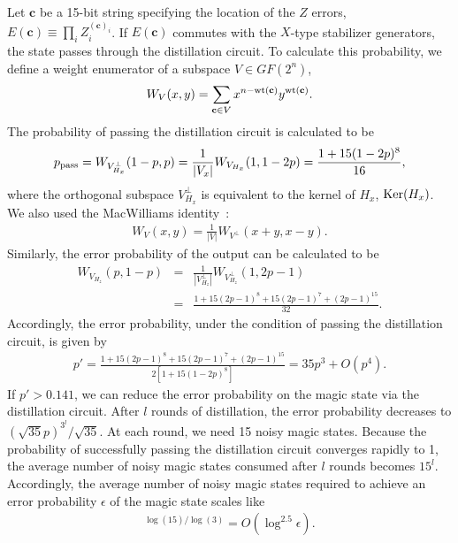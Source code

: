 Let $\mathbf{c}$ be a 15-bit string specifying the location of the $Z$ errors, $ E(\mathbf{c})\equiv \prod_i Z_i^{(\mathbf{c})_i}$.
If $E(\mathbf{c})$ commutes with the $X$-type stabilizer generators, the state passes through the distillation circuit.
To calculate this probability, we define a weight enumerator of a subspace $V \in GF(2^n)$,
\begin{eqnarray}
W_V(x,y)= \sum _{\mathbf{c} \in V} x^{n-{\rm wt}(\mathbf{c})} y^{{\rm wt}(\mathbf{c})}.
\end{eqnarray}
The probability of passing the distillation circuit is calculated to be
\begin{eqnarray}
p_{\rm pass}=W_{V_{H_x}^{\perp}}(1-p,p) = \frac{1}{|V_{x}|} W_{V_{H_x}}(1,1-2p) = \frac{1+15(1-2p)^8}{16} ,
\end{eqnarray}
where the orthogonal subspace $V_{H_x}^{\perp}$ is equivalent to the kernel of $H_x$, ${\rm Ker}(H_x)$. 
We also used the MacWilliams identity~\cite{macwilliams}:
\begin{eqnarray}
W_{V}(x,y)= \frac{1}{|V|} W_{V^{\perp}}(x+y,x-y).
\end{eqnarray}
Similarly, the error probability of the output can be calculated to be 
\begin{eqnarray}
W_{V_{H_z}}(p,1-p)&=&\frac{1}{|V_{H_z}^{\perp}|}W_{V_{H_z}^{\perp}}(1,2p-1) 
\\
&=& \frac{1+15(2p-1)^8+15(2p-1)^{7}+(2p-1)^{15}}{32}.
\end{eqnarray}
Accordingly, the error probability, under the condition of passing the distillation circuit, is given by
\begin{eqnarray}
p' = \frac{1+15(2p-1)^8+15(2p-1)^{7}+(2p-1)^{15}}{2[1+15(1-2p)^8]} = 35p^3+O(p^4).
\end{eqnarray}
If $p'>0.141$, we can reduce the error probability on the magic state via the distillation circuit.
After $l$ rounds of distillation, the error probability decreases to $(\sqrt{35} p)^{3^l}/\sqrt{35}$.
At each round, we need 15 noisy magic states. 
Because the probability of successfully passing the distillation circuit converges rapidly to 1, the average number of noisy magic states consumed after $l$ rounds becomes $15^{l}$.
Accordingly, the average number of noisy magic states required to achieve an error probability $\epsilon$ of the magic state scales like
\begin{eqnarray}
[\log (\sqrt{35} \epsilon)/ \log (\sqrt{35} p)]^{\log(15)/\log(3)} =O(\log ^{2.5} \epsilon).
\end{eqnarray}

